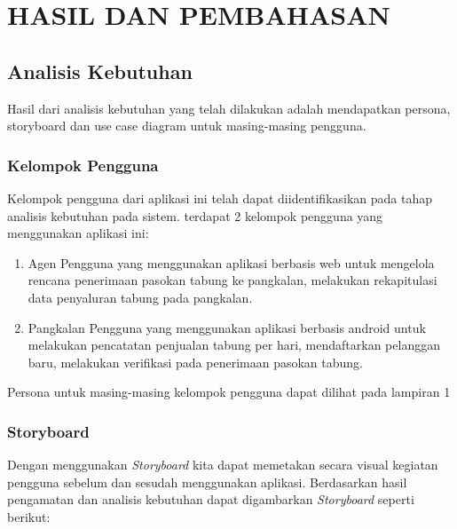 
\chapter{HASIL DAN PEMBAHASAN}
	\section{Analisis Kebutuhan}
	
	Hasil dari analisis kebutuhan yang telah dilakukan adalah mendapatkan persona, storyboard dan use case diagram untuk masing-masing pengguna.
	
	\subsection{Kelompok Pengguna}
	Kelompok pengguna dari aplikasi ini telah dapat diidentifikasikan pada tahap analisis kebutuhan pada sistem. terdapat 2 kelompok pengguna yang menggunakan aplikasi ini:
		 \begin{enumerate}[1.]
		 	\item Agen
		 		\newline Pengguna yang menggunakan aplikasi berbasis web untuk mengelola rencana penerimaan pasokan tabung ke pangkalan, melakukan rekapitulasi data penyaluran tabung pada pangkalan.
		 	\item Pangkalan
		 		\newline Pengguna yang menggunakan aplikasi berbasis android untuk melakukan pencatatan penjualan tabung per hari, mendaftarkan pelanggan baru, melakukan verifikasi pada penerimaan pasokan tabung.
		 \end{enumerate}
	 
	 Persona untuk masing-masing kelompok pengguna dapat dilihat pada lampiran 1
	
	\subsection{Storyboard}
	Dengan menggunakan \textit{Storyboard} kita dapat memetakan secara visual kegiatan pengguna sebelum dan sesudah menggunakan aplikasi. Berdasarkan hasil pengamatan dan analisis kebutuhan dapat digambarkan \textit{Storyboard} seperti berikut:
	
